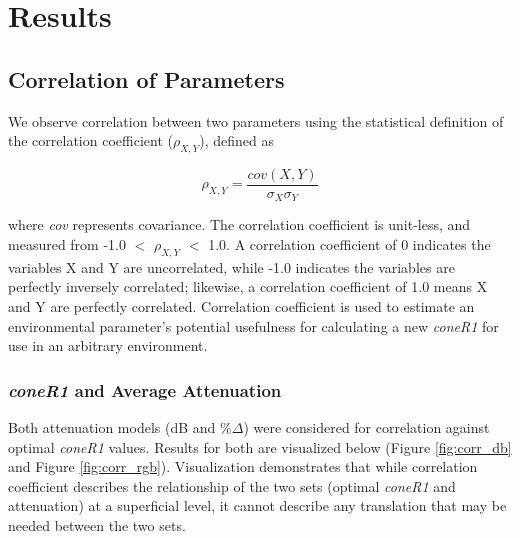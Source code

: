 \documentclass[12pt]{report}
\begin{document}
\doublespacing

\clearpage
\chapter{Results}

\section{Correlation of Parameters} \label{section:corrofparams}

We observe correlation between two parameters using the statistical definition of the correlation coefficient ($\rho_{X,Y}$), defined as

\begin{equation}
\rho_{X,Y} = \dfrac{cov(X,Y)}{\sigma_X\sigma_Y}
\end{equation}

where \textit{cov} represents covariance. The correlation coefficient is unit-less, and measured from -1.0 $<$ $\rho_{X,Y}$ $<$ 1.0. A correlation coefficient of 0 indicates the variables X and Y are uncorrelated, while -1.0 indicates the variables are perfectly inversely correlated; likewise, a correlation coefficient of 1.0 means X and Y are perfectly correlated. Correlation coefficient is used to estimate an environmental parameter's potential usefulness for calculating a new \textit{coneR1} for use in an arbitrary environment.

\subsection{\textit{coneR1} and Average Attenuation} \label{section:coner1andatten}

Both attenuation models (dB and \%$\Delta$) were considered for correlation against optimal \textit{coneR1} values. Results for both are visualized below (Figure \ref{fig:corr_db} and Figure \ref{fig:corr_rgb}). Visualization demonstrates that while correlation coefficient describes the relationship of the two sets (optimal \textit{coneR1} and attenuation) at a superficial level, it cannot describe any translation that may be needed between the two sets.
\end{document}

